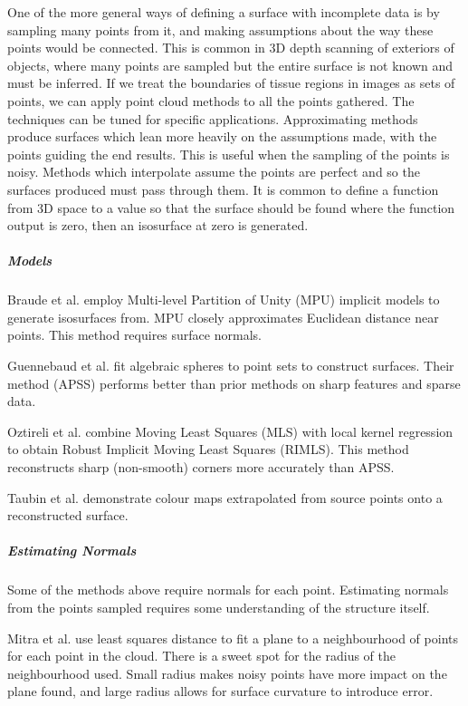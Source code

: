 \documentclass[11p, titlepage]{article}
\begin{document}
One of the more general ways of defining a surface with incomplete data is by sampling many points from it, and making assumptions about the way these points would be connected. This is common in 3D depth scanning of exteriors of objects, where many points are sampled but the entire surface is not known and must be inferred. If we treat the boundaries of tissue regions in images as sets of points, we can apply point cloud methods to all the points gathered. The techniques can be tuned for specific applications. Approximating methods produce surfaces which lean more heavily on the assumptions made, with the points guiding the end results. This is useful when the sampling of the points is noisy. Methods which interpolate assume the points are perfect and so the surfaces produced must pass through them. It is common to define a function from 3D space to a value so that the surface should be found where the function output is zero, then an isosurface at zero is generated.

\subparagraph{Models}

Braude et al. \cite{braude2007contour} employ Multi-level Partition of Unity (MPU) implicit models to generate isosurfaces from. MPU closely approximates Euclidean distance near points. This method requires surface normals. 

Guennebaud et al. \cite{guennebaud2007algebraic} fit algebraic spheres to point sets to construct surfaces. Their method (APSS) performs better than prior methods on sharp features and sparse data.

Oztireli et al. \cite{oztireli2009feature} combine Moving Least Squares (MLS) with local kernel regression to obtain Robust Implicit Moving Least Squares (RIMLS). This method reconstructs sharp (non-smooth) corners more accurately than APSS.

Taubin et al. \cite{taubin2012smooth} demonstrate colour maps extrapolated from source points onto a reconstructed surface.

\subparagraph{Estimating Normals}

Some of the methods above require normals for each point. Estimating normals from the points sampled requires some understanding of the structure itself.

Mitra et al. \cite{mitra2003estimating} use least squares distance to fit a plane to a neighbourhood of points for each point in the cloud. There is a sweet spot for the radius of the neighbourhood used. Small radius makes noisy points have more impact on the plane found, and large radius allows for surface curvature to introduce error. 
\end{document}
